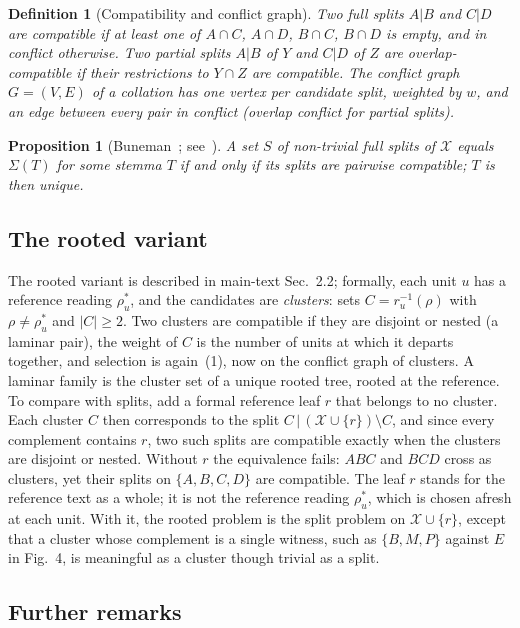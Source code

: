 \documentclass[11pt,a4paper]{article}
\newtheorem{definition}{Definition}
\newtheorem{proposition}[theorem]{Proposition}
\theoremstyle{remark}
\newcommand{\X}{\mathcal{X}}
\begin{document}
\begin{definition}[Compatibility and conflict graph]
Two full splits $A|B$ and $C|D$ are \emph{compatible} if at least one of $A\cap C$, $A\cap D$, $B\cap C$, $B\cap D$ is empty, and \emph{in conflict} otherwise. Two partial splits $A|B$ of $Y$ and $C|D$ of $Z$ are \emph{overlap-compatible} if their restrictions to $Y\cap Z$ are compatible. The \emph{conflict graph} $G=(V,E)$ of a collation has one vertex per candidate split, weighted by $w$, and an edge between every pair in conflict (overlap conflict for partial splits).
\end{definition}

\begin{proposition}[Buneman~\citep{Buneman1971}; see~\citet{SempleSteel2003}]\label{sprop:buneman}
A set $S$ of non-trivial full splits of $\X$ equals $\Sigma(T)$ for some stemma $T$ if and only if its splits are pairwise compatible; $T$ is then unique.
\end{proposition}

\subsection*{The rooted variant}
The rooted variant is described in main-text Sec.~2.2; formally, each unit $u$ has a reference reading $\rho^*_u$, and the candidates are \emph{clusters}: sets $C=r_u^{-1}(\rho)$ with $\rho\neq\rho^*_u$ and $|C|\ge2$. Two clusters are compatible if they are disjoint or nested (a laminar pair), the weight of $C$ is the number of units at which it departs together, and selection is again~(1), now on the conflict graph of clusters. A laminar family is the cluster set of a unique rooted tree, rooted at the reference. To compare with splits, add a formal reference leaf $r$ that belongs to no cluster. Each cluster $C$ then corresponds to the split $C\,|\,(\mathcal{X}\cup\{r\})\setminus C$, and since every complement contains $r$, two such splits are compatible exactly when the clusters are disjoint or nested. Without $r$ the equivalence fails: $ABC$ and $BCD$ cross as clusters, yet their splits on $\{A,B,C,D\}$ are compatible. The leaf $r$ stands for the reference text as a whole; it is not the reference reading $\rho^*_u$, which is chosen afresh at each unit. With it, the rooted problem is the split problem on $\mathcal{X}\cup\{r\}$, except that a cluster whose complement is a single witness, such as $\{B,M,P\}$ against $E$ in Fig.~4, is meaningful as a cluster though trivial as a split.

\subsection*{Further remarks}
\end{document}
